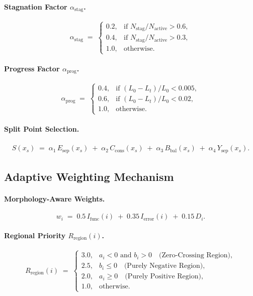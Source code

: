 \documentclass{article}
\theoremstyle{plain}
\theoremstyle{definition}
\theoremstyle{remark}
\begin{document}
\paragraph{Stagnation Factor $\alpha_{\mathrm{stag}}$.}
\begin{equation}
\alpha_{\mathrm{stag}} \;=\;
\begin{cases}
0.2, & \text{if } N_{\mathrm{stag}}/N_{\mathrm{active}} > 0.6,\\
0.4, & \text{if } N_{\mathrm{stag}}/N_{\mathrm{active}} > 0.3,\\
1.0, & \text{otherwise.}
\end{cases}
\end{equation}

\paragraph{Progress Factor $\alpha_{\mathrm{prog}}$.}
\begin{equation}
\alpha_{\mathrm{prog}} \;=\;
\begin{cases}
0.4, & \text{if } (L_0 - L_t)/L_0 < 0.005,\\
0.6, & \text{if } (L_0 - L_t)/L_0 < 0.02,\\
1.0, & \text{otherwise.}
\end{cases}
\end{equation}

\paragraph{Split Point Selection.}
\begin{align}
S(x_s) \;=\; \alpha_1\, E_{\mathrm{sep}}(x_s) \;+\; \alpha_2\, C_{\mathrm{cons}}(x_s)
\;+\; \alpha_3\, B_{\mathrm{bal}}(x_s) \;+\; \alpha_4\, Y_{\mathrm{sep}}(x_s).
\end{align}

\subsection{Adaptive Weighting Mechanism}
\paragraph{Morphology-Aware Weights.}
\begin{equation}
w_i \;=\; 0.5\, I_{\mathrm{func}}(i) \;+\; 0.35\, I_{\mathrm{error}}(i) \;+\; 0.15\, D_i.
\end{equation}
\paragraph{Regional Priority $R_{\mathrm{region}}(i)$.}
\begin{equation}
R_{\mathrm{region}}(i) \;=\;
\begin{cases}
3.0, & a_i < 0 \text{ and } b_i > 0 \quad \text{(Zero-Crossing Region)},\\
2.5, & b_i \le 0 \quad \text{(Purely Negative Region)},\\
2.0, & a_i \ge 0 \quad \text{(Purely Positive Region)},\\
1.0, & \text{otherwise.}
\end{cases}
\end{equation}
\end{document}
